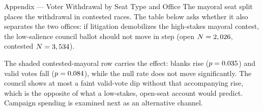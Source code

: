 
\begin{frame}{Appendix --- Voter Withdrawal by Seat Type and Office}
\hypertarget{app:seatdisengage}{}
\small
The mayoral seat split places the withdrawal in contested races. The table below asks whether it also separates the two offices: if litigation demobilizes the high-stakes mayoral contest, the low-salience council ballot should not move in step (open $N=2,026$, contested $N=3,534$).
\vspace{-2pt}
\begin{center}
\scriptsize
\resizebox{!}{0.32\textheight}{}
\end{center}
\vspace{-2pt}
\footnotesize The shaded contested-mayoral row carries the effect: blanks rise ($p=0.035$) and valid votes fall ($p=0.084$), while the null rate does not move significantly. The council shows at most a faint valid-vote dip without that accompanying rise, which is the opposite of what a low-stakes, open-seat account would predict. Campaign spending is examined next as an alternative channel.\hfill\hyperlink{app:spending}{}\,\hyperlink{app:seathet}{}
\end{frame}
